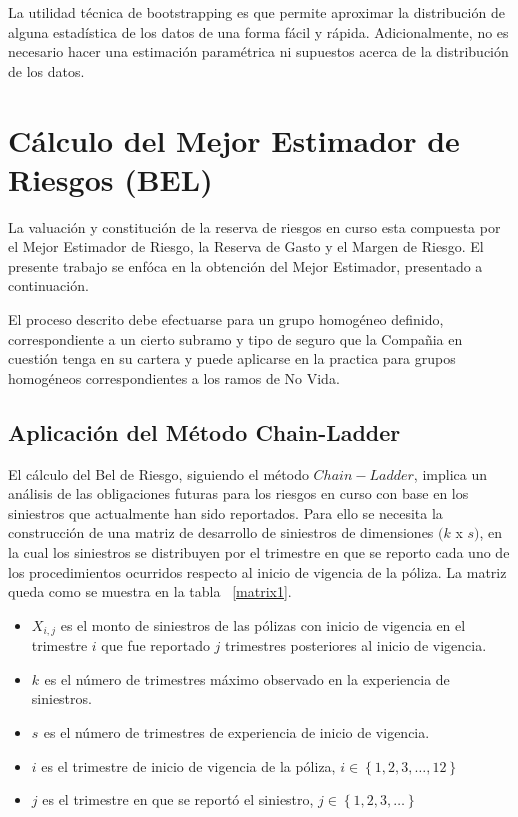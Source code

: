 \documentclass[11pt,twoside,openright,spanish]{report}
\numberwithin{equation}{chapter}
\numberwithin{figure}{chapter}
\numberwithin{table}{chapter}
\begin{document}
	La utilidad técnica de bootstrapping es que permite aproximar la distribución de alguna estadística de los datos de una forma fácil y rápida. Adicionalmente, no es necesario hacer una estimación paramétrica ni supuestos acerca de la distribución de los datos.
	
	


		
	\chapter{Cálculo del Mejor Estimador de Riesgos (BEL)}

 La valuación y constitución de la reserva de riesgos en curso esta compuesta por el Mejor Estimador de Riesgo, la Reserva de Gasto y el Margen de Riesgo. El presente trabajo se enfóca en la obtención del Mejor Estimador, presentado a continuación.
 
 El proceso descrito debe efectuarse para un grupo homogéneo definido, correspondiente a un cierto subramo y tipo de seguro que la Compañia en cuestión tenga en su cartera y puede aplicarse en la practica para grupos homogéneos correspondientes a los ramos de No Vida.

	\section{Aplicación del Método Chain-Ladder}
	
	El cálculo del Bel de Riesgo, siguiendo el método $Chain-Ladder$, implica un análisis de las obligaciones futuras para los riesgos en curso con base en los siniestros que actualmente han sido reportados. Para ello se necesita la construcción de una matriz de desarrollo de siniestros  de dimensiones $(k$ x $s)$, en la cual los siniestros se distribuyen por el trimestre en que se reporto cada uno de los procedimientos ocurridos respecto al inicio de vigencia de la póliza. La matriz queda como se muestra en la tabla ~\ref{matrix1}.

	\vspace{0.1cm}
	
	\begin{itemize}
		\setlength\itemsep{-0.5em}
		\item ${X}_{i,j}$ es el monto de siniestros de las pólizas con inicio de vigencia en el trimestre $i$ que fue reportado $j$ trimestres posteriores al inicio de vigencia.
		\item ${k}_{}$ es el número de trimestres máximo observado en la experiencia de siniestros.
		\item ${s}_{}$ es el número de trimestres de experiencia de inicio de vigencia.
		\item $i$ es el trimestre de inicio de vigencia de la póliza, $i\in \left\{1,2,3,\dots ,12\right\}$
		\item $j$ es el trimestre en que se reportó el siniestro,  $j\in \left\{1,2,3,\dots\right\}$
	\end{itemize}
	
\end{document}
